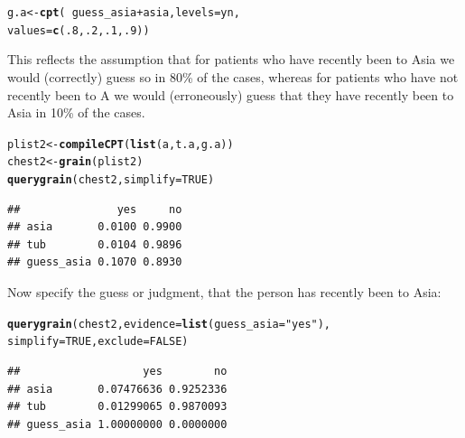 \documentclass[10pt]{article}\usepackage[]{graphicx}\usepackage[]{xcolor}
\makeatletter
\newcommand{\hlnum}[1]{\textcolor[rgb]{0.686,0.059,0.569}{#1}}%
\newcommand{\hlstr}[1]{\textcolor[rgb]{0.192,0.494,0.8}{#1}}%
\newcommand{\hlopt}[1]{\textcolor[rgb]{0,0,0}{#1}}%
\newcommand{\hlstd}[1]{\textcolor[rgb]{0.345,0.345,0.345}{#1}}%
\newcommand{\hlkwb}[1]{\textcolor[rgb]{0.69,0.353,0.396}{#1}}%
\newcommand{\hlkwc}[1]{\textcolor[rgb]{0.333,0.667,0.333}{#1}}%
\newcommand{\hlkwd}[1]{\textcolor[rgb]{0.737,0.353,0.396}{\textbf{#1}}}%
\newenvironment{kframe}{%
 \def\at@end@of@kframe{}%
 \ifinner\ifhmode%
  \def\at@end@of@kframe{\end{minipage}}%
  \begin{minipage}{\columnwidth}%
 \fi\fi%
 \def\FrameCommand##1{\hskip\@totalleftmargin \hskip-\fboxsep
 \colorbox{shadecolor}{##1}\hskip-\fboxsep
     \hskip-\linewidth \hskip-\@totalleftmargin \hskip\columnwidth}%
 \MakeFramed {\advance\hsize-\width
   \@totalleftmargin\z@ \linewidth\hsize
   \@setminipage}}%
 {\par\unskip\endMakeFramed%
 \at@end@of@kframe}
\newenvironment{knitrout}{}{} %
\makeatother
\begin{document}
\begin{knitrout}
\color{fgcolor}\begin{kframe}
\begin{alltt}
\hlstd{g.a} \hlkwb{<-} \hlkwd{cpt}\hlstd{(}\hlopt{~}\hlstd{guess_asia}\hlopt{+}\hlstd{asia,} \hlkwc{levels}\hlstd{=yn,}
              \hlkwc{values}\hlstd{=}\hlkwd{c}\hlstd{(}\hlnum{.8}\hlstd{,} \hlnum{.2}\hlstd{,} \hlnum{.1}\hlstd{,} \hlnum{.9}\hlstd{))}
\end{alltt}
\end{kframe}
\end{knitrout}

This reflects the assumption that for patients who have recently been
to Asia we would (correctly) guess so in 80\% of the cases, whereas for patients who have
not recently been to A we would (erroneously) guess that they have
recently been to Asia in 10\% of the cases.

\begin{knitrout}
\color{fgcolor}\begin{kframe}
\begin{alltt}
\hlstd{plist2} \hlkwb{<-} \hlkwd{compileCPT}\hlstd{(}\hlkwd{list}\hlstd{(a, t.a, g.a ))}
\hlstd{chest2} \hlkwb{<-} \hlkwd{grain}\hlstd{(plist2)}
\hlkwd{querygrain}\hlstd{(chest2,} \hlkwc{simplify} \hlstd{=} \hlnum{TRUE}\hlstd{)}
\end{alltt}
\begin{verbatim}
##               yes     no
## asia       0.0100 0.9900
## tub        0.0104 0.9896
## guess_asia 0.1070 0.8930
\end{verbatim}
\end{kframe}
\end{knitrout}


Now specify the guess or judgment, that the person has recently been
to Asia:

\begin{knitrout}
\color{fgcolor}\begin{kframe}
\begin{alltt}
\hlkwd{querygrain}\hlstd{(chest2,} \hlkwc{evidence}\hlstd{=}\hlkwd{list}\hlstd{(}\hlkwc{guess_asia}\hlstd{=}\hlstr{"yes"}\hlstd{),}
           \hlkwc{simplify}\hlstd{=}\hlnum{TRUE}\hlstd{,} \hlkwc{exclude} \hlstd{=} \hlnum{FALSE}\hlstd{)}
\end{alltt}
\begin{verbatim}
##                   yes        no
## asia       0.07476636 0.9252336
## tub        0.01299065 0.9870093
## guess_asia 1.00000000 0.0000000
\end{verbatim}
\end{kframe}
\end{knitrout}
\end{document}
